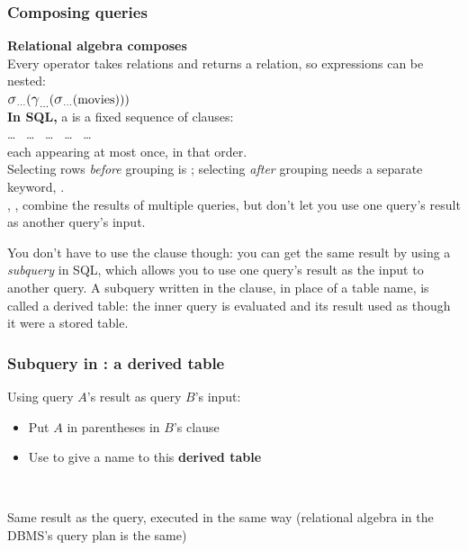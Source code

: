 \begin{frame}
    \label{s:composition}
    \frametitle{Composing queries}
    \textbf{Relational algebra composes}\\[0.2em]
    Every operator takes relations and returns a relation, so expressions can be nested:\\[0.4em]
    \hspace*{1em}$\raop{\sigma}_{\dots}(\raop{\gamma}_{\dots}(\raop{\sigma}_{\dots}(\ra{movies})))$\\[1em]\pause
    \textbf{In SQL,} a  is a fixed sequence of clauses:\\[0.3em]
    \hspace*{1em} \dots\  \dots\  \dots\  \dots\  \dots\\[0.3em]
    each appearing at most once, in that order.\\[0.5em]
    Selecting rows \emph{before} grouping is ; selecting \emph{after}
    grouping needs a separate keyword, .\\[1em]\pause
    , ,  combine the results of multiple queries, but don't let you use one query's result as another query's input.
\end{frame}
\label{l:composition}

You don't have to use the  clause though: you can get the same result by using a \emph{subquery} in SQL, which allows you to use one query's result as the input to another query.
A subquery written in the  clause, in place of a table name, is called a derived table: the inner query is evaluated and its result used as though it were a stored table.

\begin{frame}
    \label{s:subquery-from}
    \frametitle{Subquery in : a derived table}
    Using query $A$'s result as query $B$'s input:
    \begin{itemize}
        \item Put $A$ in parentheses in $B$'s  clause
        \item Use  to give a name to this \textbf{derived table}\\[0.8em]
    \end{itemize}
    \inputminted[fontsize=\footnotesize]{sql}{code/sql-subquery-from.sql}
    \vspace{0.3em}
    {\footnotesize}\\[0.8em]
    Same result as the  query, executed in the same way
    (relational algebra in the DBMS's query plan is the same)
\end{frame}
\label{l:subquery-from}

